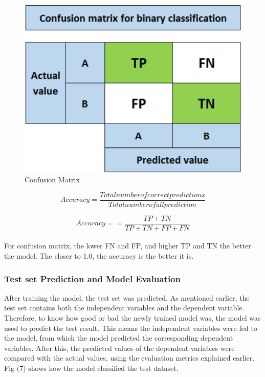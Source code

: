 \documentclass[conference]{IEEEtran}
\begin{document}
\begin{figure}[h]
    \centering
    \includegraphics[scale=0.57]{figs/confusionMatrix.png}
    \caption{Confusion Matrix}
    \label{dabc}        
\end{figure}

\begin{equation} 
\label{equ4}
Accuracy = \frac{Totalnumberofcorrectpredictions}{Totalnumberofallprediction}
\end{equation}

\begin{equation} 
\label{equ5}
Accuracy = = \frac{TP + TN}{TP + TN + FP + FN}
\end{equation}
\\
For confusion matrix, the lower FN and FP, and higher TP and TN the better the model. The closer to 1.0, the accuracy is the better it is.\\

\subsubsection{Test set Prediction and Model Evaluation}
After training the model, the test set was predicted. As mentioned earlier, the test set contains both the independent variables and the dependent variable. Therefore, to know how good or bad the newly trained model was, the model was used to predict the test result. This means the independent variables were fed to the model, from which the model predicted the corresponding dependent variables.
After this, the predicted values of the dependent variables were compared with the actual values, using the evaluation metrics explained earlier. Fig (7) shows
how the model classified the test dataset.
\end{document}

